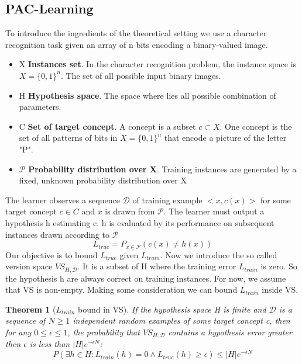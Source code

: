 \documentclass[main.tex]{subfiles}
\newtheorem{theorem}{Theorem}[section] %
\begin{document}
\subsection{PAC-Learning}
To introduce the ingredients of the theoretical setting we use a character recognition task given an array of n bits encoding a binary-valued image.
\begin{itemize}
    \item X \textbf{Instances set}. In the character recognition problem, the instance space is $X=\{0,1\}^{n}$. The set of all possible input binary images.
    \item H \textbf{Hypothesis space}. The space where lies all possible combination of parameters.
    \item C \textbf{Set of target concept}. A concept is a subset $c\subset X$. One concept is the set of all patterns of bits in  $X=\{0,1\}^{n}$ that encode a picture of the letter "P".
    \item $\mathcal{P}$ \textbf{Probability distribution over X}. Training instances are generated by a fixed, unknown probability distribution over X
\end{itemize}
The learner observes a sequence $\mathcal{D}$ of training example $<x,c(x)>$ for some target concept $c \in C$ and $x$ is drawn from $\mathcal{P}$. The learner must output a hypothesis h estimating c. h is evaluated by its performance on subsequent instances drawn according to $\mathcal{P}$
\begin{equation*}
    L_{true} = P_{x \in \mathcal{P}}(c(x) \neq h(x))
\end{equation*}
Our objective is to bound $L_{true}$ given $L_{train}$.
Now we introduce the so called version space $VS_{H,\mathcal{D}}$. It is a subset of H where the training error $L_{train}$ is zero. So the hypothesis h are always correct on training instances. For now, we assume that VS is non-empty. Making some consideration we can bound $L_{train}$ inside VS.
\begin{theorem}[$L_{train}$ bound in VS]
If the hypothesis space H is finite and $\mathcal{D}$ is a sequence of $N \geq 1$ independent random examples of some target concept c, then for any $0 \leq \epsilon \leq 1$, the probability that $VS_{H,\mathcal{D}}$ contains a hypothesis error greater then $\epsilon$ is less than $|H|e^{−\epsilon N}$:
\begin{equation*}
    P(\exists h \in H: L_{train}(h)=0 \land L_{true}(h) \geq \epsilon) \leq |H|e^{−\epsilon N}
\end{equation*}
\end{theorem}
\end{document}
